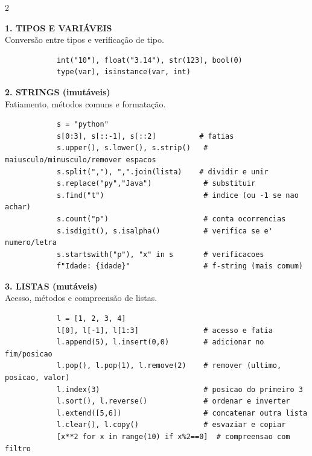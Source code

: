 \documentclass[a4paper]{article}
\begin{document}
	\begin{multicols}{2}
		
		\noindent\textbf{1. TIPOS E VARIÁVEIS} \\
		Conversão entre tipos e verificação de tipo.
		\begin{lstlisting}
			int("10"), float("3.14"), str(123), bool(0)
			type(var), isinstance(var, int)
		\end{lstlisting}
		
		\noindent\textbf{2. STRINGS (imutáveis)} \\
		Fatiamento, métodos comuns e formatação.
		\begin{lstlisting}
			s = "python"
			s[0:3], s[::-1], s[::2]          # fatias
			s.upper(), s.lower(), s.strip()   # maiusculo/minusculo/remover espacos
			s.split(","), ",".join(lista)    # dividir e unir
			s.replace("py","Java")            # substituir
			s.find("t")                       # indice (ou -1 se nao achar)
			s.count("p")                      # conta ocorrencias
			s.isdigit(), s.isalpha()          # verifica se e' numero/letra
			s.startswith("p"), "x" in s       # verificacoes
			f"Idade: {idade}"                 # f-string (mais comum)
		\end{lstlisting}
		
		\noindent\textbf{3. LISTAS (mutáveis)} \\
		Acesso, métodos e compreensão de listas.
		\begin{lstlisting}
			l = [1, 2, 3, 4]
			l[0], l[-1], l[1:3]               # acesso e fatia
			l.append(5), l.insert(0,0)        # adicionar no fim/posicao
			l.pop(), l.pop(1), l.remove(2)    # remover (ultimo, posicao, valor)
			l.index(3)                        # posicao do primeiro 3
			l.sort(), l.reverse()             # ordenar e inverter
			l.extend([5,6])                   # concatenar outra lista
			l.clear(), l.copy()               # esvaziar e copiar
			[x**2 for x in range(10) if x%2==0]  # compreensao com filtro
		\end{lstlisting}
		

\end{multicols}
\end{document}
